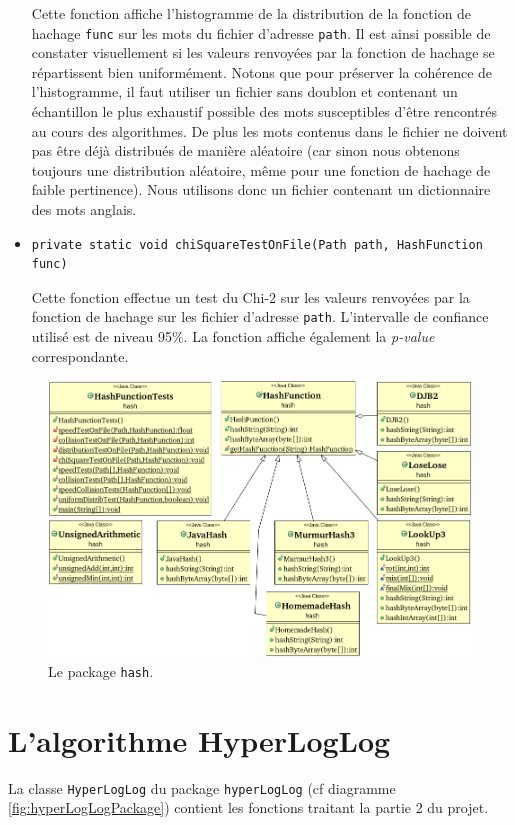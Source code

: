 \documentclass[12pt,a4paper,titlepage]{article}
\newcommand{\class}[1]{\texttt{#1}}
\begin{document}
\begin{itemize}
Cette fonction affiche l'histogramme de la distribution de la fonction de hachage \class{func} sur les mots du fichier d'adresse \class{path}. Il est ainsi possible de constater visuellement si les valeurs renvoyées par la fonction de hachage se répartissent bien uniformément. Notons que pour préserver la cohérence de l'histogramme, il faut utiliser un fichier sans doublon et contenant un échantillon le plus exhaustif possible des mots susceptibles d'être rencontrés au cours des algorithmes. De plus les mots contenus dans le fichier ne doivent pas être déjà distribués de manière aléatoire (car sinon nous obtenons toujours une distribution aléatoire, même pour une fonction de hachage de faible pertinence). Nous utilisons donc un fichier contenant un dictionnaire des mots anglais.

\item \begin{lstlisting}
private static void chiSquareTestOnFile(Path path, HashFunction func)
\end{lstlisting}
Cette fonction effectue un test du Chi-2 sur les valeurs renvoyées par la fonction de hachage sur les fichier d'adresse \class{path}. L'intervalle de confiance utilisé est de niveau 95\%. La fonction  affiche également la \textit{p-value} correspondante.

\end{itemize}

\begin{figure}
	\label{fig:hashPackage}
	\centering
	\includegraphics[scale=0.75, angle=90]{../Java Workspace/Test Hash/hashPackage.png}
	\caption{Le package \class{hash}.}
\end{figure}

\newpage
\section{L'algorithme HyperLogLog}
La classe \class{HyperLogLog} du package \class{hyperLogLog} (cf diagramme \ref{fig:hyperLogLogPackage}) contient les fonctions traitant la partie 2 du projet.\\
\end{document}
